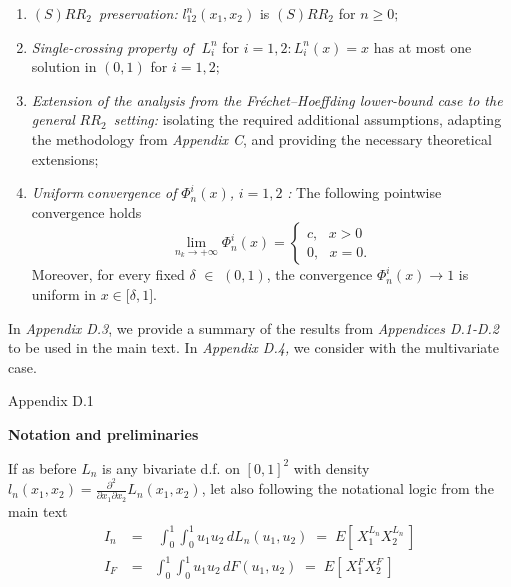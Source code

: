 \documentclass[onecolumn]{article}
\begin{document}
\begin{enumerate}
\item $(S)RR_{2}$\emph{\ preservation:} $l_{12}^{n}(x_{1},x_{2})$ is $%
(S)RR_{2}$ for $n\geq 0;$

\item \emph{Single-crossing property of}\textbf{\ }$L_{i}^{n}$ for $%
i=1,2:L_{i}^{n}(x)=x$ has at most one solution in $(0,1)$ for $i=1,2;$

\item \emph{Extension of the analysis from the Fr\'{e}chet--Hoeffding
lower-bound case to the general }$RR_{2}$\emph{\ setting: }isolating the
required additional assumptions, adapting the methodology from \textit{%
Appendix C}, and providing the necessary theoretical extensions;

\item \emph{Uniform} c\emph{onvergence of }$\Phi _{n}^{i}(x)$\emph{, }$i=1,2$%
\emph{: }The following pointwise convergence holds%
\begin{equation}
\lim_{n_{k}\rightarrow +\infty }\Phi _{n}^{i}(x)=\left\{ 
\begin{array}{c}
c,\text{ }x>0 \\ 
0,\text{ }x=0.%
\end{array}%
\right.  \label{302}
\end{equation}%
Moreover, for every fixed $\delta $ $\in $ $(0,1)$, the convergence $\Phi
_{n}^{i}(x)\rightarrow 1$ is uniform in $x\in \lbrack \delta ,1]$.
\end{enumerate}

In \textit{Appendix D.3}, we provide a summary of the results from \textit{%
Appendices D.1-D.2} to be used in the main text. In \textit{Appendix D.4, }%
we consider with the multivariate case.

\begin{flushleft}
{\large Appendix D.1}

\textbf{Notation and preliminaries}
\end{flushleft}

If as before $L_{n}$ is any bivariate d.f. on $[0,1]^{2}$ with density $%
l_{n}(x_{1},x_{2})=\frac{\partial ^{2}}{\partial x_{1}\partial x_{2}}%
L_{n}(x_{1},x_{2})$, let also following the notational logic from the main
text 
\begin{eqnarray}
I_{n}\;
&=&\;\int_{0}^{1}\int_{0}^{1}u_{1}u_{2}\,dL_{n}(u_{1},u_{2})\;=\;E[%
\,X_{1}^{L_{n}}X_{2}^{L_{n}}\,]  \label{303} \\
I_{F}
&=&\int_{0}^{1}\int_{0}^{1}u_{1}u_{2}\,dF(u_{1},u_{2})\;=\;E[%
\,X_{1}^{F}X_{2}^{F}\,]  \label{303.1}
\end{eqnarray}
\end{document}

